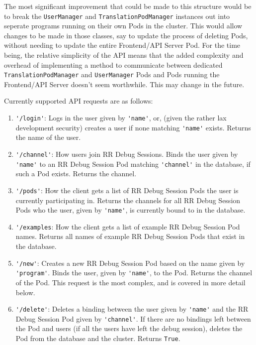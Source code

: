 \documentclass[12pt]{article}
\begin{document}
The most significant improvement that could be made to this structure
would be to break the \lstinline{UserManager} and
\lstinline{TranslationPodManager} instances out into seperate programs
running on their own Pods in the cluster.  This would allow changes to
be made in those classes, say to update the process of deleting Pods,
without needing to update the entire Frontend/API Server Pod.  For the
time being, the relative simplicity of the API means that the added
complexity and overhead of implementing a method to communicate
between dedicated \lstinline{TranslationPodManager} and
\lstinline{UserManager} Pods and Pods running the Frontend/API Server
doesn't seem worthwhile.  This may change in the future.
\par

Currently supported API requests are as follows:

\begin{enumerate}
\item \lstinline{'/login'}: Logs in the user given by
  \lstinline{'name'}, or, (given the rather lax development security)
  creates a user if none matching \lstinline{'name'} exists.  Returns
  the name of the user.
\item \lstinline{'/channel'}: How users join RR Debug Sessions.  Binds
  the user given by \lstinline{'name'} to an RR Debug Session Pod
  matching \lstinline{'channel'} in the database, if such a Pod
  exists.  Returns the channel.
\item \lstinline{'/pods'}: How the client gets a list of RR Debug
  Session Pods the user is currently participating in.  Returns the
  channels for all RR Debug Session Pods who the user, given by
  \lstinline{'name'}, is currently bound to in the database.
\item \lstinline{'/examples}: How the client gets a list of example RR
  Debug Session Pod names.  Returns all names of example RR Debug
  Session Pods that exist in the database.
\item \lstinline{'/new'}: Creates a new RR Debug Session Pod based on
  the name given by \lstinline{'program'}.  Binds the user, given by
  \lstinline{'name'}, to the Pod.  Returns the channel of the Pod.
  This request is the most complex, and is covered in more detail
  below.
\item \lstinline{'/delete'}: Deletes a binding between the user given
  by \lstinline{'name'} and the RR Debug Session Pod given by
  \lstinline{'channel'}.  If there are no bindings left between the
  Pod and users (if all the users have left the debug session),
  deletes the Pod from the database and the cluster.  Returns
  \lstinline{True}.
\end{enumerate}
\end{document}
